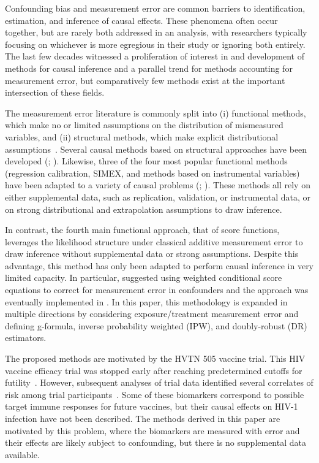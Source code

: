 \documentclass[useAMS,usenatbib,referee]{biom}
\begin{document}
Confounding bias and measurement error are common barriers to identification, estimation, and inference of causal effects. These phenomena often occur together, but are rarely both addressed in an analysis, with researchers typically focusing on whichever is more egregious in their study or ignoring both entirely. The last few decades witnessed a proliferation of interest in and development of methods for causal inference and a parallel trend for methods accounting for measurement error, but comparatively few methods exist at the important intersection of these fields.

The measurement error literature is commonly split into (i) functional methods, which make no or limited assumptions on the distribution of mismeasured variables, and (ii) structural methods, which make explicit distributional assumptions~\citep{carroll2006}. Several causal methods based on structural approaches have been developed (\citealp{kuroki2014,edwards2015multiple,braun2017}; \citealp*{hong2017}). Likewise, three of the four most popular functional methods (regression calibration, SIMEX, and methods based on instrumental variables) have been adapted to a variety of causal problems (\citealp*{vansteelandt2009}; \citealp{cole2010,kendall2015,lockwood2015,kyle2016,wu2019}). These methods all rely on either supplemental data, such as replication, validation, or instrumental data, or on strong distributional and extrapolation assumptions to draw inference.

In contrast, the fourth main functional approach, that of score functions, leverages the likelihood structure under classical additive measurement error to draw inference without supplemental data or strong assumptions. Despite this advantage, this method has only been adapted to perform causal inference in very limited capacity. In particular, \citet*{mccaffrey2013} suggested using weighted conditional score equations to correct for measurement error in confounders and the approach was eventually implemented in \citet{shu2019}. In this paper, this methodology is expanded in multiple directions by considering exposure/treatment measurement error and defining g-formula, inverse probability weighted (IPW), and doubly-robust (DR) estimators.

The proposed methods are motivated by the HVTN 505 vaccine trial. This HIV vaccine efficacy trial was stopped early after reaching predetermined cutoffs for futility~\citep{hammer2013}. However, subsequent analyses of trial data identified several correlates of risk among trial participants~\citep{decamp2017,janes2017,fong2018,neidich2019}. Some of these biomarkers correspond to possible target immune responses for future vaccines, but their causal effects on HIV-1 infection have not been described. The methods derived in this paper are motivated by this problem, where the biomarkers are measured with error and their effects are likely subject to confounding, but there is no supplemental data available.
\end{document}
